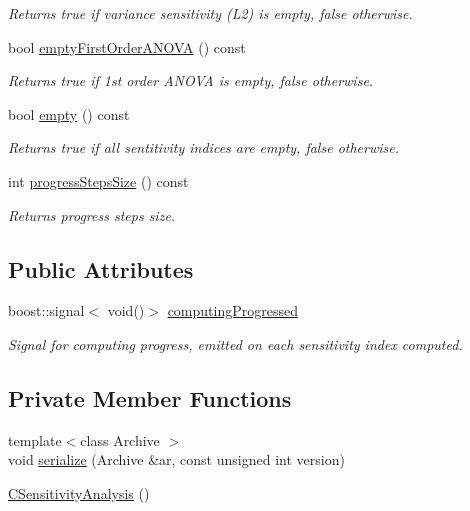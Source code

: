 \begin{DoxyCompactItemize}
\begin{DoxyCompactList}\small\item\em Returns true if variance sensitivity (L2) is empty, false otherwise. \end{DoxyCompactList}\item 
bool \hyperlink{class_go_s_u_m_1_1_c_sensitivity_analysis_a8c1533d57beb4f671bff7725c85a1e3a}{empty\-First\-Order\-A\-N\-O\-V\-A} () const 
\begin{DoxyCompactList}\small\item\em Returns true if 1st order A\-N\-O\-V\-A is empty, false otherwise. \end{DoxyCompactList}\item 
bool \hyperlink{class_go_s_u_m_1_1_c_sensitivity_analysis_a5900537612a1fbff3bfb9d3052681195}{empty} () const 
\begin{DoxyCompactList}\small\item\em Returns true if all sentitivity indices are empty, false otherwise. \end{DoxyCompactList}\item 
int \hyperlink{class_go_s_u_m_1_1_c_sensitivity_analysis_a2c854cf2bb8c5a6bb610fa50957b0a0e}{progress\-Steps\-Size} () const 
\begin{DoxyCompactList}\small\item\em Returns progress steps size. \end{DoxyCompactList}\end{DoxyCompactItemize}
\subsection*{Public Attributes}
\begin{DoxyCompactItemize}
\item 
boost\-::signal$<$ void()$>$ \hyperlink{class_go_s_u_m_1_1_c_sensitivity_analysis_a27d7ec32318e94f97569c7f8bc1080f8}{computing\-Progressed}
\begin{DoxyCompactList}\small\item\em Signal for computing progress, emitted on each sensitivity index computed. \end{DoxyCompactList}\end{DoxyCompactItemize}
\subsection*{Private Member Functions}
\begin{DoxyCompactItemize}
\item 
{\footnotesize template$<$class Archive $>$ }\\void \hyperlink{class_go_s_u_m_1_1_c_sensitivity_analysis_a22f847db8628ebc695b14b6bc4068e0a}{serialize} (Archive \&ar, const unsigned int version)
\item 
\hyperlink{class_go_s_u_m_1_1_c_sensitivity_analysis_aed43f527d22035d9cf363138d2e93539}{C\-Sensitivity\-Analysis} ()
\end{DoxyCompactItemize}
